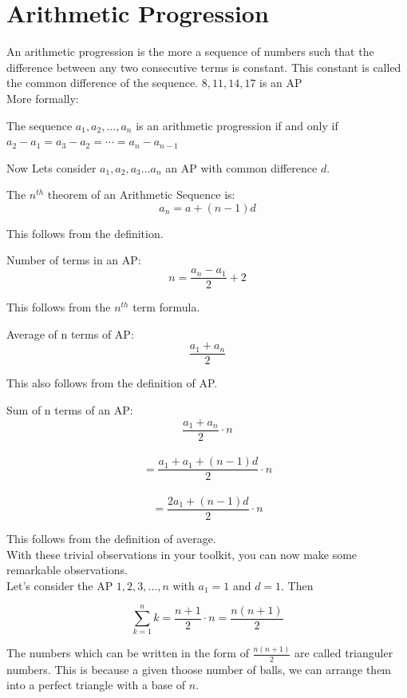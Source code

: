 \section{Arithmetic Progression}
An arithmetic progression is the more a sequence of numbers such that the difference between any two consecutive terms is constant. This constant is called the common difference of the sequence. $8,11,14,17$ is an AP\\
More formally: \\
\begin{definition}
    The sequence $a_1, a_2, \ldots , a_n$ is an arithmetic progression if and only if $a_2 - a_1 = a_3 - a_2 = \cdots = a_n - a_{n-1}$
\end{definition}
Now Lets consider $a_1, a_2, a_3 \dots a_n$ an AP with common difference $d$.
\begin{theorem}
    The $n^{th}$ theorem of an Arithmetic Sequence is:\\
    \[a_{n}=a+(n-1)d\]
\end{theorem}
This follows from the definition. 
\begin{theorem}
    Number of terms in an AP:\\
    \[n=\frac{a_n-a_1}{2}+2\]
\end{theorem}
This follows from the $n^{th}$ term formula.
\begin{theorem}
    Average of n terms of AP:\\
    \[\frac{a_1+a_n}{2}\]
\end{theorem}
This also follows from the definition of AP.
\begin{theorem}
    Sum of n terms of an AP:
    \[\frac{a_1+a_n}{2}\cdot n\]\\
    \[=\frac{a_1+a_1+(n-1)d}{2}\cdot n\]\\
    \[=\frac{2a_1+(n-1)d}{2}\cdot n\]
\end{theorem}
This follows from the definition of average.\\
With these trivial observations in your toolkit, you can now make some remarkable observations.\\
Let's consider the AP $1,2,3,\dots,n$ with $a_1=1$ and $d=1$. Then\\
\begin{theorem}
     \[\sum^n_{k=1}k=\frac{n+1}{2}\cdot n=\frac{n(n+1)}{2}\]
\end{theorem}
The numbers which can be written in the form of $\frac{n(n+1)}{2}$ are called trianguler numbers. This is because a given thoose number of balls, we can arrange them into a perfect triangle with a base of $n$. \\
